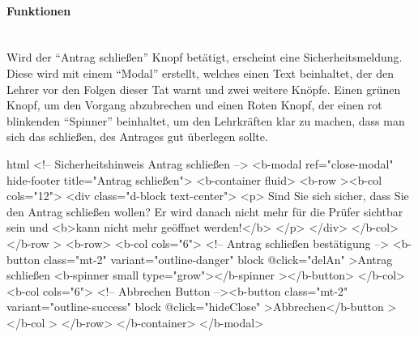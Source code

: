 \paragraph{Funktionen}
~\\
Wird der \enquote{Antrag schließen} Knopf betätigt, erscheint eine Sicherheitsmeldung. Diese wird mit einem \enquote{Modal} erstellt, welches einen Text beinhaltet, der den Lehrer vor den Folgen dieser Tat warnt und zwei weitere Knöpfe. Einen grünen Knopf, um den Vorgang abzubrechen und einen Roten Knopf, der einen rot blinkenden \enquote{Spinner} beinhaltet, um den Lehrkräften klar zu machen, dass man sich das schließen, des Antrages gut überlegen sollte.
\begin{code}{html}
	<!-- Sicherheitshinweis Antrag schließen -->
    <b-modal ref="close-modal" hide-footer title="Antrag schließen">
      <b-container fluid>
        <b-row
          ><b-col cols="12">
            <div class="d-block text-center">
              <p>
                Sind Sie sich sicher, dass Sie den Antrag schließen wollen? Er
                wird danach nicht mehr für die Prüfer sichtbar sein und
                <b>kann nicht mehr geöffnet werden!</b>
              </p>
            </div>
          </b-col></b-row
        >
        <b-row>
          <b-col cols="6">
            <!-- Antrag schließen bestätigung -->
            <b-button class="mt-2" variant="outline-danger" block @click="delAn"
              >Antrag schließen <b-spinner small type="grow"></b-spinner
            ></b-button>
          </b-col>
          <b-col cols="6">
            <!-- Abbrechen Button --><b-button
              class="mt-2"
              variant="outline-success"
              block
              @click="hideClose"
              >Abbrechen</b-button
            ></b-col
          >
        </b-row>
      </b-container>
    </b-modal>
\end{code}
	\label{list:securityalert} ~\\
~\\

\newpage
